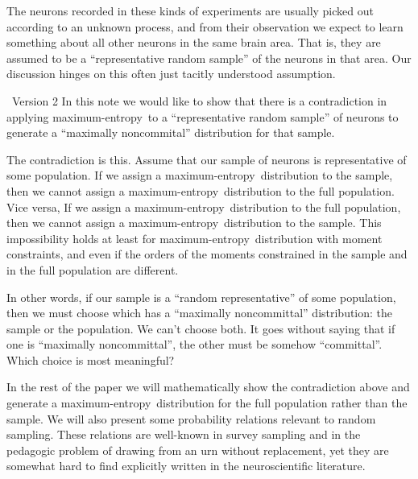 \documentclass{article}
\theoremstyle{remark}
\theoremstyle{innote}
\renewcommand*{\|}{\mathpunct{|}}%
\theoremstyle{simple}
\newcommand*{\puzzle}{{\fontencoding{U}\fontfamily{fontawesometwo}\selectfont\symbol{225}}}
\newcommand{\mynote}[1]{ {\color{notecolour}\puzzle\ #1}}
\newcommand*{\me}{maximum-entropy}
\begin{document}
The neurons recorded in these kinds of experiments are usually picked out
according to an unknown process, and from their observation we expect to
learn something about all other neurons in the same brain area. That is,
they are assumed to be a \enquote{representative random sample} of the
neurons in that area. Our discussion hinges on this often just tacitly
understood assumption.


\mynote{Version 2 }
In this note we would like to show that there is a
contradiction in applying \me\ to a \enquote{representative random sample}
of neurons to generate a \enquote{maximally noncommital} distribution for
that sample.

The contradiction is this. Assume that our sample of neurons is
representative of some population. If we assign a \me\ distribution to the
sample, then we cannot assign a \me\ distribution to the full population.
Vice versa, If we assign a \me\ distribution to the full population, then
we cannot assign a \me\ distribution to the sample. This impossibility
holds at least for \me\ distribution with moment constraints, and even if
the orders of the moments constrained in the sample and in the full
population are different.

In other words, if our sample is a \enquote{random representative} of some
population, then we must choose which has a \enquote{maximally
  noncommittal} distribution: the sample or the population. We can't choose
both. It goes without saying that if one is \enquote{maximally
  noncommittal}, the other must be somehow \enquote{committal}. Which
choice is most meaningful?

In the rest of the paper we will mathematically show the contradiction
above and generate a \me\ distribution for the full population rather than
the sample. We will also present some probability relations relevant to
random sampling. These relations are well-known in survey sampling and in
the pedagogic problem of drawing from an urn without replacement, yet they
are somewhat hard to find explicitly written in the neuroscientific
literature.
\end{document}
